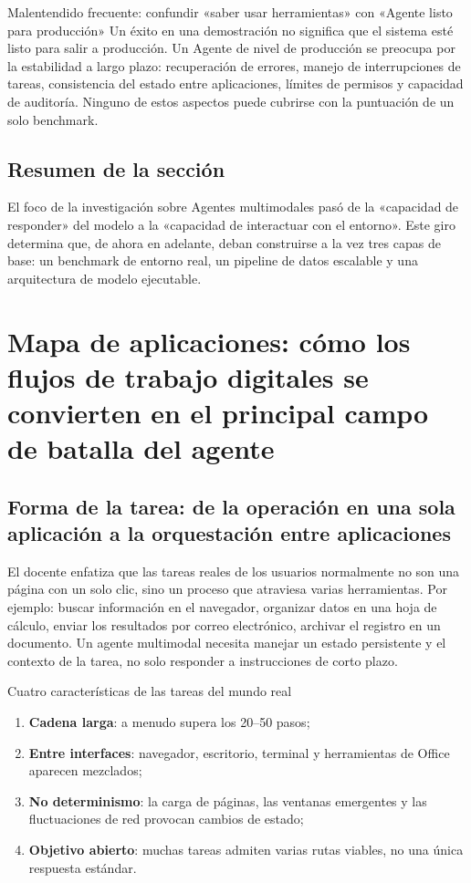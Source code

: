 \documentclass[a4paper]{article}
\begin{document}
\begin{warningbox}{Malentendido frecuente: confundir «saber usar herramientas» con «Agente listo para producción»}
Un éxito en una demostración no significa que el sistema esté listo para salir a producción. Un Agente de nivel de producción se preocupa por la estabilidad a largo plazo: recuperación de errores, manejo de interrupciones de tareas, consistencia del estado entre aplicaciones, límites de permisos y capacidad de auditoría. Ninguno de estos aspectos puede cubrirse con la puntuación de un solo benchmark.
\end{warningbox}

\subsection{Resumen de la sección}
El foco de la investigación sobre Agentes multimodales pasó de la «capacidad de responder» del modelo a la «capacidad de interactuar con el entorno». Este giro determina que, de ahora en adelante, deban construirse a la vez tres capas de base: un benchmark de entorno real, un pipeline de datos escalable y una arquitectura de modelo ejecutable.
\section{Mapa de aplicaciones: cómo los flujos de trabajo digitales se convierten en el principal campo de batalla del agente}

\subsection{Forma de la tarea: de la operación en una sola aplicación a la orquestación entre aplicaciones}
El docente enfatiza que las tareas reales de los usuarios normalmente no son una página con un solo clic, sino un proceso que atraviesa varias herramientas. Por ejemplo: buscar información en el navegador, organizar datos en una hoja de cálculo, enviar los resultados por correo electrónico, archivar el registro en un documento. Un agente multimodal necesita manejar un estado persistente y el contexto de la tarea, no solo responder a instrucciones de corto plazo.

\begin{importantbox}{Cuatro características de las tareas del mundo real}
\begin{enumerate}
    \item \textbf{Cadena larga}: a menudo supera los 20--50 pasos;
    \item \textbf{Entre interfaces}: navegador, escritorio, terminal y herramientas de Office aparecen mezclados;
    \item \textbf{No determinismo}: la carga de páginas, las ventanas emergentes y las fluctuaciones de red provocan cambios de estado;
    \item \textbf{Objetivo abierto}: muchas tareas admiten varias rutas viables, no una única respuesta estándar.
\end{enumerate}
\end{importantbox}
\end{document}
